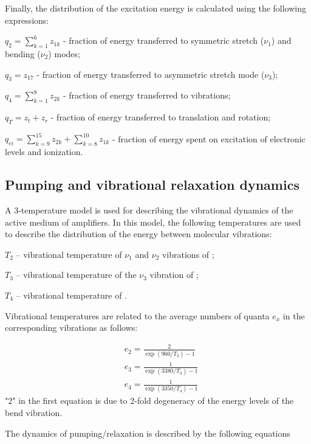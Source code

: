 Finally, the distribution of the excitation energy is calculated using the following expressions:

$q_2 = \sum\limits_{k=1}^6 z_{1k}$ - fraction of energy transferred to  symmetric stretch ($\nu_1$) and bending ($\nu_2$) modes;

$q_3 = z_{17}$ - fraction of energy transferred to  asymmetric stretch mode ($\nu_3$);

$q_4 = \sum\limits_{k=1}^8 z_{2k}$ - fraction of energy transferred to  vibrations;

$q_T = z_t + z_r$ - fraction of energy transferred to translation and rotation;

$q_{ei} = \sum\limits_{k=9}^{15} z_{2k}  + \sum\limits_{k=8}^{10} z_{1k}$ - fraction of energy spent on excitation of electronic levels and ionization.



\subsection{Pumping and vibrational relaxation dynamics}
A 3-temperature model is used for describing the vibrational dynamics of the active medium of  amplifiers. In this model, the following temperatures are used to describe the distribution of the energy between molecular vibrations:

$T_2$ – vibrational temperature of $\nu_1$ and $\nu_2$ vibrations of ;

$T_3$ – vibrational temperature of the $\nu_3$ vibration of ;

$T_4$ – vibrational temperature of .

Vibrational temperatures are related to the average numbers of quanta $e_x$ in the corresponding vibrations as follows:

\begin{equation}\label{eq:e}
\begin{aligned}
&{e_2} = \frac{2}{\exp(960/{T_2})-1}\\
&{e_3} = \frac{1}{\exp(3380/{T_3})-1}\\
&{e_4} = \frac{1}{\exp(3350/{T_4})-1} 
\end{aligned}
\end{equation}
"2" in the first equation is due to 2-fold degeneracy of the energy levels of the bend vibration.

The dynamics of pumping/relaxation is described by the following equations


